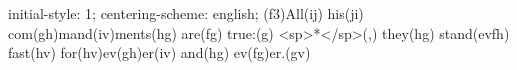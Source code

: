 initial-style: 1;
centering-scheme: english;
(f3)All(ij) his(ji) com(gh)mand(iv)ments(hg) are(fg) true:(g) <sp>*</sp>(,) they(hg) stand(evfh) fast(hv) for(hv)ev(gh)er(iv) and(hg) ev(fg)er.(gv)